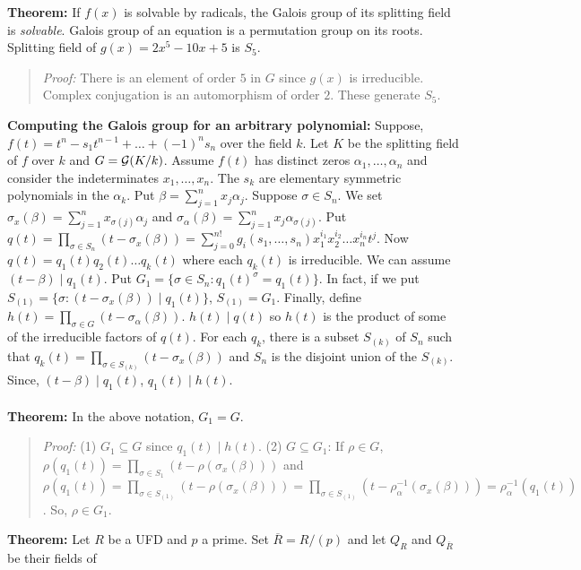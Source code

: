 {\bf Theorem:}
If $f(x)$ is solvable by radicals, the Galois group of its splitting field
is \emph{solvable}.  Galois group of an equation is a permutation group on its roots.
Splitting field of $g(x)= 2x^5 -10 x+5$ is $S_5$.
\begin{quote}
\emph{Proof:} 
There is an element of order $5$ in $G$ since $g(x)$ is irreducible.  Complex conjugation
is an automorphism of order $2$.  These generate $S_5$.
\end{quote}
{\bf Computing the Galois group for an arbitrary polynomial:}
Suppose, 
$f(t) = t^n -s_1 t^{n-1} + \ldots + (-1)^{n}s_n$ over the field $k$.  
Let $K$ be the splitting field of $f$ over $k$ and $G = {\cal G}(K/k)$.
Assume
$f(t)$ has distinct zeros $\alpha_1, \ldots , \alpha_n$ and consider the
indeterminates $x_1, \ldots, x_n$.  The $s_k$ are elementary symmetric polynomials
in the $\alpha_k$.  Put $\beta = \sum_{j=1}^n x_j \alpha_j$.  Suppose
$\sigma \in S_n$.  We set $\sigma_x ( \beta ) = \sum_{j=1}^n x_{\sigma(j)} \alpha_j$
and $\sigma_{\alpha} ( \beta ) = \sum_{j=1}^n x_{j} \alpha_{\sigma(j)}$. Put
$q(t) = \prod_{\sigma \in S_n} (t - \sigma_x(\beta)) = 
\sum_{j=0}^{n!} g_i (s_1 , \ldots, s_n) x_1^{i_1} x_2^{i_2} \ldots x_n^{i_n} t^j$.
Now $q(t) = q_1(t) q_2(t) \ldots q_k(t)$ where each $q_k(t)$ is irreducible.
We can assume $(t - \beta) \mid q_1(t)$.
Put $G_1 = \{ \sigma \in S_n: q_1(t)^{\sigma} = q_1(t) \}$.  In fact, if we
put $S_{(1)} = \{ \sigma : (t - \sigma_x(\beta)) \mid q_1 (t) \}$, $S_{(1)} = G_1$.
Finally, define
$h(t) = \prod_{\sigma \in G} (t - \sigma_{\alpha}(\beta))$. $h(t) \mid q(t)$ so
$h(t)$ is the product of some of the irreducible factors of $q(t)$.
For each $q_k$, there is a subset $S_{(k)}$ of $S_n$ such that
$q_k(t) = \prod_{\sigma \in S_{(k)}} (t - \sigma_x(\beta))$ and $S_n$ is the disjoint union
of the $S_{(k)}$.
Since, $(t - \beta) \mid q_1(t)$, $q_1(t) \mid h(t)$.
\\
\\
{\bf Theorem:} In the above notation, $G_1 = G$.
\begin{quote}
\emph{Proof:} (1) $G_1 \subseteq G$ since $q_1(t) \mid h(t)$. (2) $G \subseteq G_1$:
If $\rho \in G$, $\rho(q_1(t)) = \prod_{\sigma \in S_1} (t- \rho(\sigma_x(\beta)))$ and
$\rho(q_1(t)) = \prod_{\sigma \in S_{(1)}} (t- \rho(\sigma_x(\beta))) = 
\prod_{\sigma \in S_{(1)}} (t- \rho_{\alpha}^{-1}(\sigma_{x}(\beta))) = \rho_{\alpha}^{-1}(q_1(t))$.
So, $\rho \in G_1$.
\end{quote}
{\bf Theorem:} Let $R$ be a UFD and $p$ a prime.  Set 
${\overline R}= R/(p)$ and let $Q_R$ and $Q_{\overline R}$ be their fields of
